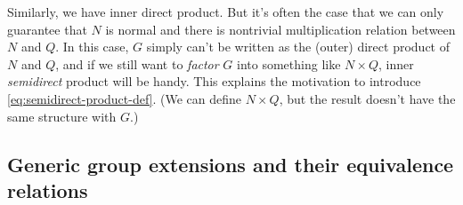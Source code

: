 \documentclass[hyperref, a4paper]{article}
\begin{document}
Similarly, we have inner direct product. But it's often the case that we can only guarantee that $N$ is normal 
and there is nontrivial multiplication relation between $N$ and $Q$. In this case, $G$ simply can't be 
written as the (outer) direct product of $N$ and $Q$, and if we still want to \emph{factor} $G$ into 
something like $N \times Q$, inner \emph{semidirect} product will be handy. This explains the motivation
to introduce \eqref{eq:semidirect-product-def}. (We can define $N \times Q$, but the result doesn't have 
the same structure with $G$.)

\subsection{Generic group extensions and their equivalence relations}
\end{document}
